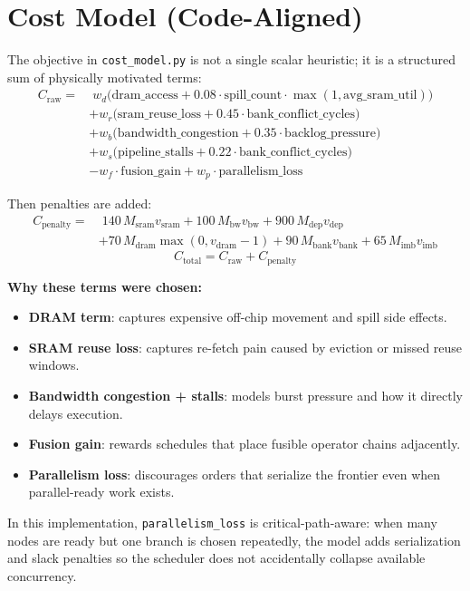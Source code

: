 \documentclass[11pt]{article}
\begin{document}
\section{Cost Model (Code-Aligned)}
The objective in \texttt{cost\_model.py} is not a single scalar heuristic; it is a structured sum of physically motivated terms:
\[
\begin{aligned}
C_{\text{raw}} =
&\;w_d\big(\text{dram\_access} + 0.08\cdot\text{spill\_count}\cdot\max(1,\text{avg\_sram\_util})\big) \\
&+ w_r\big(\text{sram\_reuse\_loss} + 0.45\cdot\text{bank\_conflict\_cycles}\big) \\
&+ w_b\big(\text{bandwidth\_congestion} + 0.35\cdot\text{backlog\_pressure}\big) \\
&+ w_s\big(\text{pipeline\_stalls} + 0.22\cdot\text{bank\_conflict\_cycles}\big) \\
&- w_f\cdot\text{fusion\_gain} + w_p\cdot\text{parallelism\_loss}
\end{aligned}
\]

Then penalties are added:
\[
\begin{aligned}
C_{\text{penalty}} =
&\;140\,M_{\text{sram}}v_{\text{sram}} + 100\,M_{\text{bw}}v_{\text{bw}} + 900\,M_{\text{dep}}v_{\text{dep}} \\
&+ 70\,M_{\text{dram}}\max(0, v_{\text{dram}}-1)
+ 90\,M_{\text{bank}}v_{\text{bank}}
+ 65\,M_{\text{imb}}v_{\text{imb}}
\end{aligned}
\]
\[
C_{\text{total}} = C_{\text{raw}} + C_{\text{penalty}}
\]

\textbf{Why these terms were chosen:}
\begin{itemize}
    \item \textbf{DRAM term}: captures expensive off-chip movement and spill side effects.
    \item \textbf{SRAM reuse loss}: captures re-fetch pain caused by eviction or missed reuse windows.
    \item \textbf{Bandwidth congestion + stalls}: models burst pressure and how it directly delays execution.
    \item \textbf{Fusion gain}: rewards schedules that place fusible operator chains adjacently.
    \item \textbf{Parallelism loss}: discourages orders that serialize the frontier even when parallel-ready work exists.
\end{itemize}

In this implementation, \texttt{parallelism\_loss} is critical-path-aware: when many nodes are ready but one branch is chosen repeatedly, the model adds serialization and slack penalties so the scheduler does not accidentally collapse available concurrency.
\end{document}
